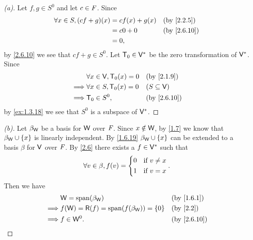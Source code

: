 \begin{proof}[(a)]
  Let \(f, g \in S^0\) and let \(c \in \mathit{F}\).
  Since
  \begin{align*}
    \forall x \in S, (cf + g)(x) & = cf(x) + g(x) &  & \text{(by \cref{2.2.5})}  \\
                                 & = c0 + 0       &  & \text{(by \cref{2.6.10})} \\
                                 & = 0,
  \end{align*}
  by \cref{2.6.10} we see that \(cf + g \in S^0\).
  Let \(\mathsf{T}_0 \in \mathsf{V}^*\) be the zero transformation of \(\mathsf{V}^*\).
  Since
  \begin{align*}
             & \forall x \in \V, \zT(x) = 0 &  & \text{(by \cref{2.1.9})}  \\
    \implies & \forall x \in S, \zT(x) = 0  &  & (S \subseteq \V)          \\
    \implies & \zT \in S^0,                 &  & \text{(by \cref{2.6.10})}
  \end{align*}
  by \cref{ex:1.3.18} we see that \(S^0\) is a subspace of \(\mathsf{V}^*\).
\end{proof}

\begin{proof}[(b)]
  Let \(\beta_{\mathsf{W}}\) be a basis for \(\mathsf{W}\) over \(\mathit{F}\).
  Since \(x \notin \mathsf{W}\), by \cref{1.7} we know that \(\beta_{\mathsf{W}} \cup \left\lbrace x\right\rbrace\) is linearly independent.
  By \cref{1.6.19} \(\beta_{\mathsf{W}} \cup \left\lbrace x\right\rbrace\) can be extended to a basis \(\beta\) for \(\mathsf{V}\) over \(\mathit{F}\).
  By \cref{2.6} there exists a \(f \in \mathsf{V}^*\) such that
  \[
    \forall v \in \beta, f(v) = \begin{dcases}
      0 & \text{if } v \neq x \\
      1 & \text{if } v = x
    \end{dcases}.
  \]
  Then we have
  \begin{align*}
             & \W = \spn{\beta_{\W}}                          &  & \text{(by \cref{1.6.1})}  \\
    \implies & f(\W) = \rg{f} = \spn{f(\beta_{\W})} = \set{0} &  & \text{(by \cref{2.2})}    \\
    \implies & f \in \W^0.                                    &  & \text{(by \cref{2.6.10})}
  \end{align*}
\end{proof}

